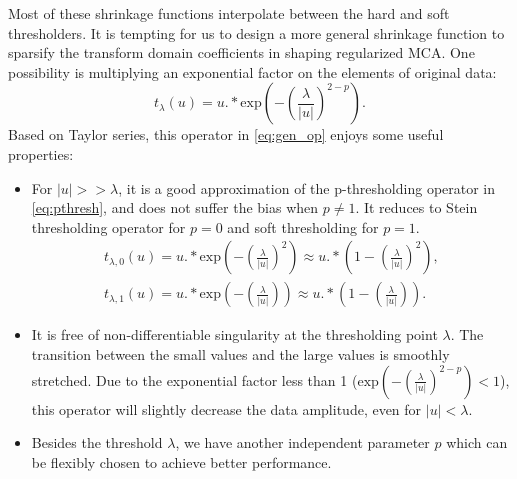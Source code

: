 Most of these shrinkage functions interpolate between the hard and soft thresholders. It is tempting for us to design a more general shrinkage function to sparsify the transform domain coefficients in shaping regularized MCA. One possibility is  multiplying an exponential factor on the elements of original data:
\begin{equation}\label{eq:gen_op}
t_{\lambda}(u)=u.*\mathrm{exp}(-(\frac{\lambda}{|u|})^{2-p}).
\end{equation}
Based on Taylor series, this operator in \eqref{eq:gen_op} enjoys some useful properties:
\begin{itemize}
 \item For $|u|>>\lambda$, it is a good approximation of the p-thresholding operator in \eqref{eq:pthresh}, and does not suffer the bias when $p\neq 1$. It reduces to Stein thresholding operator for $p=0$ and soft thresholding for $p=1$. 
  \begin{equation}\label{eq:exp_sergey} 
  \begin{split}   
  t_{\lambda,0}(u)=u.*\mathrm{exp}(-(\frac{\lambda}{|u|})^{2})\approx u.*(1-(\frac{\lambda}{|u|})^{2}),\\
  t_{\lambda,1}(u)=u.*\mathrm{exp}(-(\frac{\lambda}{|u|}))\approx u.*(1-(\frac{\lambda}{|u|})).
  \end{split}
\end{equation}
 \item It is free of non-differentiable singularity at the thresholding point $\lambda$. The transition between the small values and the large values is smoothly stretched. Due to the exponential factor less than 1 ($\mathrm{exp}(-(\frac{\lambda}{|u|})^{2-p})<1$), this operator will slightly decrease the data amplitude, even for $|u|<\lambda$.
 \item Besides the threshold $\lambda$, we have another independent parameter $p$ which can be flexibly chosen to achieve better performance.
\end{itemize}

